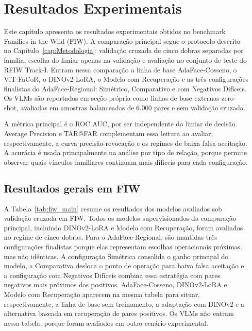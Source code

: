 \chapter[Resultados Experimentais]{Resultados Experimentais}
\label{cap:resultados}

Este capítulo apresenta os resultados experimentais obtidos no benchmark Families in the Wild (FIW). A comparação principal segue o protocolo descrito no Capítulo~\ref{cap:Metodologia}: validação cruzada de cinco dobras separadas por família, escolha do limiar apenas na validação e avaliação no conjunto de teste do RFIW Track-I. Entram nessa comparação a linha de base AdaFace-Cosseno, o ViT-FaCoR, o DINOv2-LoRA, o Modelo com Recuperação e as três configurações finalistas do AdaFace-Regional: Simétrico, Comparativo e com Negativos Difíceis. Os VLMs são reportados em seção própria como linhas de base externas zero-shot, avaliadas em amostras balanceadas de 6.000 pares e sem validação cruzada.

A métrica principal é o ROC AUC, por ser independente do limiar de decisão. Average Precision e TAR@FAR complementam essa leitura ao avaliar, respectivamente, a curva precisão-revocação e os regimes de baixa falsa aceitação. A acurácia é usada principalmente na análise por tipo de relação, porque permite observar quais vínculos familiares continuam mais difíceis para cada configuração.

\section{Resultados gerais em FIW}

A Tabela~\ref{tab:fiw_main} resume os resultados dos modelos avaliados sob validação cruzada em FIW. Todos os modelos supervisionados da comparação principal, incluindo DINOv2-LoRA e Modelo com Recuperação, foram avaliados no regime de cinco dobras. Para o AdaFace-Regional, são mantidas três configurações finalistas porque elas representam escolhas operacionais próximas, mas não idênticas. A configuração Simétrica consolida o ganho principal do modelo, a Comparativa desloca o ponto de operação para baixa falsa aceitação e a configuração com Negativos Difíceis combina essa estratégia com pares negativos mais próximos dos positivos. AdaFace-Cosseno, DINOv2-LoRA e Modelo com Recuperação aparecem na mesma tabela para situar, respectivamente, a linha de base sem treinamento, a adaptação com DINOv2 e a alternativa baseada em recuperação de pares positivos. Os VLMs não entram nessa tabela, porque foram avaliados em outro cenário experimental.

